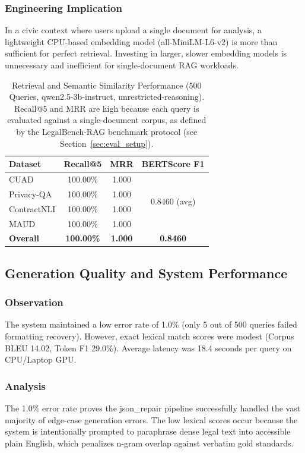 \documentclass[conference]{IEEEtran}
\begin{document}
\subsubsection*{Engineering Implication}
In a civic context where users upload a single document for analysis, a lightweight CPU-based embedding model (all-MiniLM-L6-v2) is more than sufficient for perfect retrieval. Investing in larger, slower embedding models is unnecessary and inefficient for single-document RAG workloads.

\begin{table}[!t]
\centering
\caption{Retrieval and Semantic Similarity Performance (500 Queries, qwen2.5-3b-instruct, unrestricted-reasoning). Recall@5 and MRR are high because each query is evaluated against a single-document corpus, as defined by the LegalBench-RAG benchmark protocol (see Section~\ref{sec:eval_setup}).}
\label{tab:retrieval_results}
\renewcommand{\arraystretch}{1.2}
\begin{tabular}{lccc}
\toprule
\textbf{Dataset} & \textbf{Recall@5} & \textbf{MRR} & \textbf{BERTScore F1} \\
\midrule
CUAD        & 100.00\% & 1.000 & \multirow{4}{*}{0.8460 (avg)} \\
Privacy-QA  & 100.00\% & 1.000 & \\
ContractNLI & 100.00\% & 1.000 & \\
MAUD        & 100.00\% & 1.000 & \\
\midrule
\textbf{Overall} & \textbf{100.00\%} & \textbf{1.000} & \textbf{0.8460} \\
\bottomrule
\end{tabular}
\end{table}

\subsection{Generation Quality and System Performance}
\label{sec:generation_results}

\subsubsection*{Observation}
The system maintained a low error rate of 1.0\% (only 5 out of 500 queries failed formatting recovery). However, exact lexical match scores were modest (Corpus BLEU 14.02, Token F1 29.0\%). Average latency was 18.4 seconds per query on CPU/Laptop GPU.

\subsubsection*{Analysis}
The 1.0\% error rate proves the json\_repair pipeline successfully handled the vast majority of edge-case generation errors. The low lexical scores occur because the system is intentionally prompted to paraphrase dense legal text into accessible plain English, which penalizes n-gram overlap against verbatim gold standards.
\end{document}
